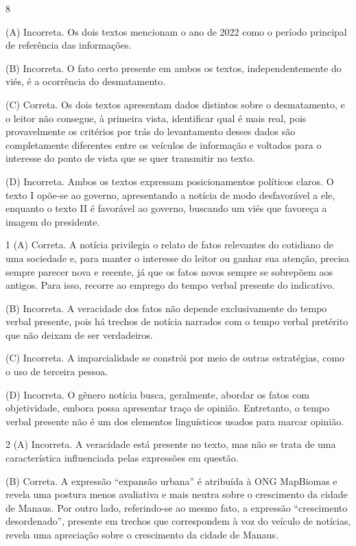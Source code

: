 \num{8}

(A) Incorreta. Os dois textos mencionam o ano de 2022 como o período
principal de referência das informações. 

(B) Incorreta. O fato certo
presente em ambos os textos, independentemente do viés, é a ocorrência
do desmatamento. 

(C) Correta. Os dois textos apresentam dados distintos
sobre o desmatamento, e o leitor não consegue, à primeira vista,
identificar qual é mais real, pois provavelmente os critérios por trás
do levantamento desses dados são completamente diferentes entre os
veículos de informação e voltados para o interesse do ponto de vista que
se quer transmitir no texto. 

(D) Incorreta. Ambos os textos expressam
posicionamentos políticos claros. O texto I opõe-se ao governo,
apresentando a notícia de modo desfavorável a ele, enquanto o texto II é
favorável ao governo, buscando um viés que favoreça a imagem do
presidente.


\num{1}
(A) Correta. A notícia privilegia o relato de fatos relevantes do
cotidiano de uma sociedade e, para manter o interesse do leitor ou
ganhar sua atenção, precisa sempre parecer nova e recente, já que os
fatos novos sempre se sobrepõem aos antigos. Para isso, recorre ao
emprego do tempo verbal presente do indicativo. 

(B) Incorreta. A
veracidade dos fatos não depende exclusivamente do tempo verbal
presente, pois há trechos de notícia narrados com o tempo verbal
pretérito que não deixam de ser verdadeiros. 

(C) Incorreta. A
imparcialidade se constrói por meio de outras estratégias, como o uso de
terceira pessoa. 

(D) Incorreta. O gênero notícia busca, geralmente,
abordar os fatos com objetividade, embora possa apresentar traço de
opinião. Entretanto, o tempo verbal presente não é um dos elementos
linguísticos usados para marcar opinião.

\num{2}
(A) Incorreta. A veracidade está presente no texto, mas não se trata de
uma característica influenciada pelas expressões em questão. 

(B)
Correta. A expressão ``expansão urbana'' é atribuída à ONG MapBiomas e
revela uma postura menos avaliativa e mais neutra sobre o crescimento da
cidade de Manaus. Por outro lado, referindo-se ao mesmo fato, a
expressão ``crescimento desordenado'', presente em trechos que
correspondem à voz do veículo de notícias, revela uma apreciação sobre o
crescimento da cidade de Manaus. 

